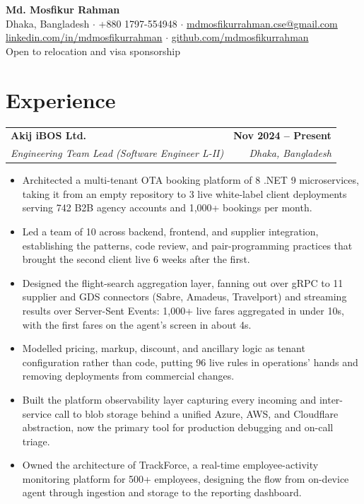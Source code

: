 \documentclass[letterpaper,10.5pt]{article}
\makeatletter
\newcommand{\entry}[4]{%
  \needspace{5\baselineskip}
  \begin{tabularx}{\textwidth}{@{}Xr@{}}
    \textbf{#1} & \textbf{#2} \\
    \textit{#3} & \textit{#4} \\
  \end{tabularx}
  \nopagebreak
  \vspace{-2pt}
}
\newenvironment{points}
  {\begin{itemize}[leftmargin=12pt, itemsep=1.5pt, topsep=3pt, parsep=0pt, label=$\bullet$]}
  {\end{itemize}\vspace{4pt}}
\makeatother
\begin{document}
\begin{center}
  {\LARGE\bfseries Md. Mosfikur Rahman}\\[4pt]
  \small
  Dhaka, Bangladesh $\cdot$ +880 1797-554948 $\cdot$
  \href{mailto:mdmosfikurrahman.cse@gmail.com}{mdmosfikurrahman.cse@gmail.com}\\[2pt]
  \href{https://linkedin.com/in/mdmosfikurrahman}{linkedin.com/in/mdmosfikurrahman} $\cdot$
  \href{https://github.com/mdmosfikurrahman}{github.com/mdmosfikurrahman}\\[2pt]
  Open to relocation and visa sponsorship
\end{center}

\vspace{2pt}

\section{Experience}

\entry{Akij iBOS Ltd.}{Nov 2024 -- Present}{Engineering Team Lead (Software Engineer L-II)}{Dhaka, Bangladesh}
\begin{points}
\item Architected a multi-tenant OTA booking platform of 8 .NET 9 microservices, taking it from an empty repository to 3 live white-label client deployments serving 742 B2B agency accounts and 1,000+ bookings per month.
\item Led a team of 10 across backend, frontend, and supplier integration, establishing the patterns, code review, and pair-programming practices that brought the second client live 6 weeks after the first.
\item Designed the flight-search aggregation layer, fanning out over gRPC to 11 supplier and GDS connectors (Sabre, Amadeus, Travelport) and streaming results over Server-Sent Events: 1,000+ live fares aggregated in under 10s, with the first fares on the agent's screen in about 4s.
\item Modelled pricing, markup, discount, and ancillary logic as tenant configuration rather than code, putting 96 live rules in operations' hands and removing deployments from commercial changes.
\item Built the platform observability layer capturing every incoming and inter-service call to blob storage behind a unified Azure, AWS, and Cloudflare abstraction, now the primary tool for production debugging and on-call triage.
\item Owned the architecture of TrackForce, a real-time employee-activity monitoring platform for 500+ employees, designing the flow from on-device agent through ingestion and storage to the reporting dashboard.
\end{points}
\end{document}
